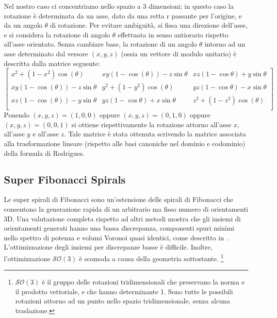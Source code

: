 Nel nostro caso ci concentriamo nello spazio a 3 dimensioni; in questo caso la rotazione è determinata da un asse, dato da una retta r passante per l'origine, e da un angolo $\theta$ di rotazione. Per evitare ambiguità, si fissa una direzione dell'asse, e si considera la rotazione di angolo $\theta$ effettuata in senso antiorario rispetto all'asse orientato. Senza cambiare base, la rotazione di un angolo $\theta$ intorno ad un asse determinato dal versore $(x, y, z)$ (ossia un vettore di modulo unitario) è descritta dalla matrice seguente:
$$
\begin{bmatrix}
	x^2+(1-x^2)\cos(\theta) & xy(1-\cos(\theta))-z\sin{\theta} & xz(1-\cos{\theta})+y\sin{\theta} \\
	xy(1-\cos(\theta))-z\sin{\theta} & y^2+(1-y^2)\cos(\theta) & yz(1-\cos{\theta})-x\sin{\theta} \\
	xz(1-\cos(\theta))-y\sin{\theta} & yz(1-\cos{\theta})+x\sin{\theta} & z^2+(1-z^2)\cos(\theta) \\
\end{bmatrix}
$$
Ponendo $(x, y, z) = (1, 0, 0)$ oppure $(x, y, z) = (0, 1, 0)$ oppure $(x, y, z) = (0, 0, 1)$ si ottiene rispettivamente la rotazione attorno all'asse $x$, all'asse $y$ e all'asse $z$. 
Tale matrice è stata ottenuta scrivendo la matrice associata alla trasformazione lineare (rispetto alle basi canoniche nel dominio e codominio) della formula di Rodrigues.

\subsection{Super Fibonacci Spirals}\label{subsec:superfibonaccispiral}
Le super spirali di Fibonacci sono un'estensione delle spirali di Fibonacci che consentono la generazione rapida di un arbitrario ma fisso numero di orientamenti 3D. Una valutazione completa rispetto ad altri metodi mostra che gli insiemi di orientamenti generati hanno una bassa discrepanza, componenti spuri minimi nello spettro di potenza e volumi Voronoi quasi identici, come descritto in \cite{Alexa_2022_CVPR}. 
L'ottimizzazione degli insiemi per discrepanze basse è difficile. Inoltre, l'ottimizzazione $\mathcal{SO}(3)$ è scomoda a causa della geometria sottostante. \footnote{$\mathcal{SO}(3)$ è il gruppo delle rotazioni tridimensionali che preservano la norma e il prodotto vettoriale, e che hanno determinante 1. Sono tutte le possibili rotazioni attorno ad un punto nello spazio tridimensionale, senza alcuna traslazione.}


